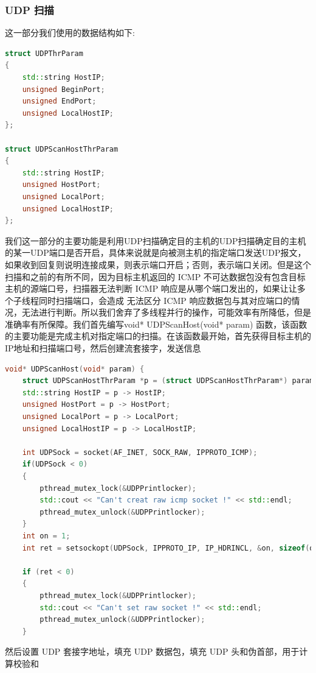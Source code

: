 \documentclass[UTF8,a4paper,10pt]{ctexart}
\begin{document}
\subsubsection{UDP 扫描}
这一部分我们使用的数据结构如下:
\begin{lstlisting}[language = C++]
struct UDPThrParam
{
	std::string HostIP;
	unsigned BeginPort;
	unsigned EndPort;
	unsigned LocalHostIP;
};

struct UDPScanHostThrParam
{
	std::string HostIP;
	unsigned HostPort;
    unsigned LocalPort;
	unsigned LocalHostIP;
};
\end{lstlisting}
我们这一部分的主要功能是利用UDP扫描确定目的主机的UDP扫描确定目的主机的某一UDP端口是否开启，具体来说就是向被测主机的指定端口发送UDP报文，如果收到回复则说明连接成果，则表示端口开启；否则，表示端口关闭。但是这个扫描和之前的有所不同，因为目标主机返回的 ICMP 不可达数据包没有包含目标主机的源端口号，扫描器无法判断 ICMP 响应是从哪个端口发出的，如果让让多个子线程同时扫描端口，会造成 无法区分 ICMP 响应数据包与其对应端口的情况，无法进行判断。所以我们舍弃了多线程并行的操作，可能效率有所降低，但是准确率有所保障。我们首先编写void* UDPScanHost(void* param) 函数，该函数的主要功能是完成主机对指定端口的扫描。在该函数最开始，首先获得目标主机的IP地址和扫描端口号，然后创建流套接字，发送信息
\begin{lstlisting}[language = C++]
void* UDPScanHost(void* param) {
    struct UDPScanHostThrParam *p = (struct UDPScanHostThrParam*) param;
    std::string HostIP = p -> HostIP;
	unsigned HostPort = p -> HostPort;
	unsigned LocalPort = p -> LocalPort;
	unsigned LocalHostIP = p -> LocalHostIP;

    int UDPSock = socket(AF_INET, SOCK_RAW, IPPROTO_ICMP); 
    if(UDPSock < 0)
	{
		pthread_mutex_lock(&UDPPrintlocker);
		std::cout << "Can't creat raw icmp socket !" << std::endl;
		pthread_mutex_unlock(&UDPPrintlocker);
	}
    int on = 1;
    int ret = setsockopt(UDPSock, IPPROTO_IP, IP_HDRINCL, &on, sizeof(on)); 

    if (ret < 0) 
	{
		pthread_mutex_lock(&UDPPrintlocker);
		std::cout << "Can't set raw socket !" << std::endl;
		pthread_mutex_unlock(&UDPPrintlocker);
	}
\end{lstlisting}
然后设置 UDP 套接字地址，填充 UDP 数据包，填充 UDP 头和伪首部，用于计算校验和
\end{document}
